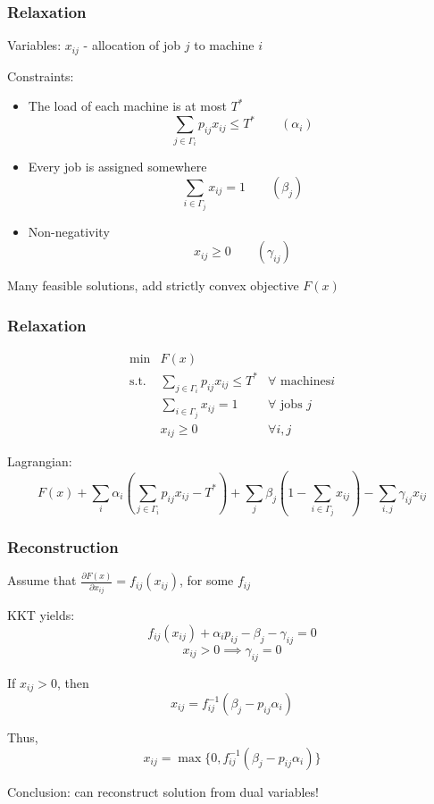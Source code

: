 \documentclass{beamer}
\begin{document}
\begin{frame}
\frametitle{Relaxation}

Variables: $x_{ij}$ - allocation of job $j$ to machine $i$


Constraints:
\begin{itemize}
\item The load of each machine is at most $T^*$
\[
\sum_{j \in \Gamma_i} p_{ij} x_{ij} \leq T^* \qquad (\alpha_i)
\]
\item Every job is assigned somewhere
\[
\sum_{i \in \Gamma_j} x_{ij} = 1 \qquad (\beta_j)
\]
\item Non-negativity
\[
x_{ij} \geq 0 \qquad (\gamma_{ij})
\]


\end{itemize}

\end{frame}



\begin{frame}

Many feasible solutions, add strictly convex objective $F(x)$

\frametitle{Relaxation}
\[
\begin{array}{ccc}
\min & F(x) & \\
\text{s.t.} & \sum_{j \in \Gamma_i} p_{ij} x_{ij} \leq T^* & \forall \text{ machines} i \\
 & \sum_{i \in \Gamma_j} x_{ij} = 1 & \forall \text{ jobs } j \\
 & x_{ij} \geq 0 & \forall i,j
\end{array}
\]

Lagrangian:
\[
F(x) + \sum_{i} \alpha_i\left(\sum_{j \in \Gamma_i} p_{ij} x_{ij} - T^* \right) + \sum_{j} \beta_j \left( 1 -  \sum_{i \in \Gamma_j} x_{ij}\right) - \sum_{i,j} \gamma_{ij} x_{ij}
\]
\end{frame}

\begin{frame}
\frametitle{Reconstruction}
Assume that $\frac{\partial F(x)}{\partial x_{ij}} = f_{ij}(x_{ij})$, for some $f_{ij}$
 
KKT yields:
\[
f_{ij}(x_{ij}) + \alpha_i p_{ij} - \beta_j -\gamma_{ij} = 0
\]
\[
x_{ij} > 0 \implies \gamma_{ij} = 0
\]

If $x_{ij} > 0$, then
\[
x_{ij} = f_{ij}^{-1}(\beta_j - p_{ij} \alpha_{i})
\]

Thus,
\[
x_{ij} = \max \{ 0, f_{ij}^{-1}(\beta_j - p_{ij} \alpha_{i}) \}
\]

Conclusion: can reconstruct solution from dual variables!

\end{frame}
\end{document}
